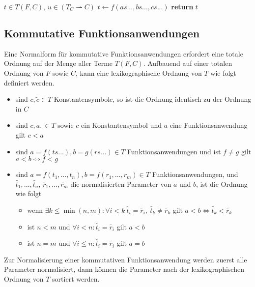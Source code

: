 \documentclass{scrartcl}
\begin{document}
\begin{algorithm}
\caption{$\mathrm{flatten} \colon T \times (T_C \rightharpoonup C) \rightarrow T$}\label{flatten}
\begin{algorithmic}[1] %
\Require $t \in T(F, C)$, $u \in (T_C \rightharpoonup C)$
		\State $t \leftarrow f(as..., bs..., cs...)$
	\EndWhile
\EndIf
\State \textbf{return} $t$ 
\end{algorithmic}
\end{algorithm}

\subsection{Kommutative Funktionsanwendungen}
Eine Normalform für kommutative Funktionsanwendungen erfordert eine totale Ordnung auf der Menge aller Terme $T(F, C)$. Aufbauend auf einer totalen Ordnung von $F$ sowie $C$, kann eine lexikographische Ordnung von $T$ wie folgt definiert werden. 
\begin{itemize}
	\item{sind $c, \tilde{c} \in T$ Konstantensymbole, so ist die Ordnung identisch zu der Ordnung in $C$}
	\item{sind $c, a, \in T$ sowie $c$ ein Konstantensymbol und $a$ eine Funktionsanwendung gilt $c < a$ }
	\item{sind $a = f(ts...), b = g(rs...) \in T$ Funktionsanwendungen und ist $f \neq g$ gilt $a < b \iff f < g $}
	\item{sind $a = f(t_1, \dots, t_n), b = f(r_1, \dots, r_m) \in T$ Funktionsanwendungen, und $\tilde{t_1}, \dots, \tilde{t_n}$, $\tilde{r_1}, \dots, \tilde{r_m}$ die normalisierten Parameter von $a$ und $b$, ist die Ordnung wie folgt}
	\begin{itemize}
		\item{wenn $\exists k \leq \min{(n, m)} \colon \forall i < k ~ \tilde{t_i} = \tilde{r_i} ,~ \tilde{t_k} \neq \tilde{r_k} $ gilt ${a < b \iff \tilde{t_k} < \tilde{r_k}}$}
		\item{ist $n < m$ und $\forall i < n\colon \tilde{t_i} = \tilde{r_i}$ gilt $a < b$}
		\item{ist $n = m$ und $\forall i \leq n\colon \tilde{t_i} = \tilde{r_i}$ gilt $a = b$}
	\end{itemize}
\end{itemize}
Zur Normalisierung einer kommutativen Funktionsanwendung werden zuerst alle Parameter normalisiert, dann können die Parameter nach der lexikographischen Ordnung von $T$ sortiert werden.
\end{document}
